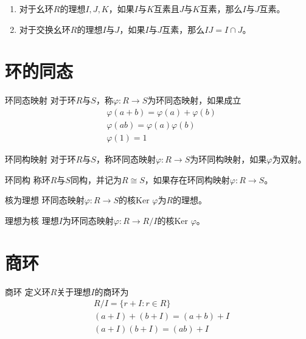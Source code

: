 \documentclass[lang = cn, scheme = chinese, thmcnt = section]{elegantbook}
\begin{document}
\begin{proposition}
	\begin{enumerate}
		\item 对于幺环$R$的理想$I,J,K$，如果$I$与$K$互素且$J$与$K$互素，那么$I$与$J$互素。
		\item 对于交换幺环$R$的理想$I$与$J$，如果$I$与$J$互素，那么$IJ=I\cap J$。
	\end{enumerate}
\end{proposition}

\section{环的同态}

\begin{definition}{环同态映射}
	对于环$R$与$S$，称$\varphi:R\to S$为环同态映射，如果成立
	\begin{align*}
		&\varphi(a+b)=\varphi(a)+\varphi(b)\\
		&\varphi(ab)=\varphi(a)\varphi(b)\\
		&\varphi(1)=1
	\end{align*}
\end{definition}

\begin{definition}{环同构映射}
	对于环$R$与$S$，称环同态映射$\varphi:R\to S$为环同构映射，如果$\varphi$为双射。
\end{definition}

\begin{definition}{环同构}
	称环$R$与$S$同构，并记为$R\cong S$，如果存在环同构映射$\varphi:R\to S$。
\end{definition}

\begin{theorem}{核为理想}
	环同态映射$\varphi:R\to S$的核$\text{Ker }\varphi$为$R$的理想。
\end{theorem}

\begin{theorem}{理想为核}
	理想$I$为环同态映射$\varphi:R\to R/I$的核$\text{Ker }\varphi$。
\end{theorem}

\section{商环}

\begin{definition}{商环}
	定义环$R$关于理想$I$的商环为
	\begin{align*}
		&R/I=\{ r+I:r\in R \}\\
		&(a+I)+(b+I)=(a+b)+I\\
		&(a+I)(b+I)=(ab)+I
	\end{align*}
\end{definition}
\end{document}
